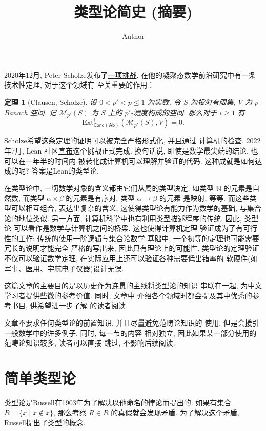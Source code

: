 \documentclass[UTF8, zihao=-4]{ctexart}
\title{类型论简史 (摘要)}
\date{}
\author{Author}
\theoremstyle{plain}
\newtheorem*{theorem}{定理}
\theoremstyle{definition}
\theoremstyle{remark}
\begin{document}
\maketitle

2020年12月, Peter Scholze发布了\href{https://xenaproject.wordpress.com/2020/12/05/liquid-tensor-experiment/}{一项挑战}.
在他的凝聚态数学前沿研究中有一条技术性定理, 对于这个领域有
至关重要的作用：
\begin{theorem}[Clausen, Scholze]
设 \(0 < p' < p \le 1\) 为实数, 令 \(S\) 为投射有限集,
\(V\) 为 \(p\)-Banach 空间. 记 \(\mathcal M_{p'}(S)\)
为 \(S\) 上的 \(p'\)-测度构成的空间. 那么对于 \(i \ge 1\) 有
\[\mathrm{Ext}_{\mathsf{Cond}(\mathsf{Ab})}^i(
  \mathcal M_{p'}(S), V
) = 0.\]
\end{theorem}
Scholze希望这条定理的证明可以被完全严格形式化, 并且通过
计算机的检查. 2022年7月, Lean
社区\href{https://leanprover-community.github.io/blog/posts/lte-final/}{宣布}这个挑战正式完成.
换句话说, 即使是数学最尖端的结论, 也可以在一年半的时间内
被转化成计算机可以理解并验证的代码.
这种成就是如何达成的呢? 答案是Lean的类型论.

在类型论中, 一切数学对象的含义都由它们从属的类型决定.
如类型 \(\mathbb N\) 的元素是自然数, 而类型 \(\alpha \times \beta\)
的元素是有序对, 类型 \(\alpha \to\beta\) 的元素
是映射, 等等. 而这些类型可以相互组合, 表达出复杂的含义,
这使得类型论有能力作为数学的基础, 与集合论的地位类似.
另一方面, 计算机科学中也有利用类型描述程序的传统. 因此, 类型论
可以看作是数学与计算机之间的桥梁. 这也使得计算机定理
验证成为了有可行性的工作: 传统的使用一阶逻辑与集合论数学
基础中, 一个初等的定理也可能需要冗长的说明才能完全
严格的写出来, 因此只有理论上的可能性.
类型论的定理验证不仅可以验证数学定理,
在实际应用上还可以验证各种需要低出错率的
软硬件(如军事、医用、宇航电子仪器)设计无误.


这篇文章的主要目的是以历史作为连贯的主线将类型论的知识
串联在一起, 为中文学习者提供些微的参考价值. 同时, 文章中
介绍各个领域时都会提及其中优秀的参考书目, 供希望进一步了解
的读者阅读.

文章不要求任何类型论的前置知识, 并且尽量避免范畴论知识的
使用, 但是会援引一般数学中的许多例子. 同时, 每一节的内容
相对独立, 因此如果某一部分使用的范畴论知识较多, 读者可以直接
跳过, 不影响后续阅读.

\section{简单类型论}
类型论是Russell在1903年为了解决以他命名的悖论而提出的.
如果有集合 \(R = \{x \mid x \notin x\}\), 那么考察
\(R \in R\) 的真假就会发现矛盾. 为了解决这个矛盾,
Russell提出了类型的概念.
\end{document}
